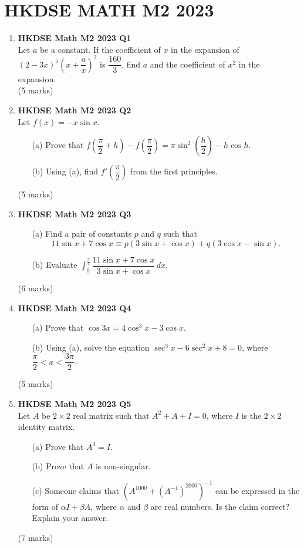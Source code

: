 \documentclass{report}
\begin{document}
\chapter{HKDSE MATH M2 2023}
\begin{enumerate}
	\item \textbf{HKDSE Math M2 2023 Q1}\\
	Let $a$ be a constant. If the coefficient of $x$ in the expansion of $(2-3x)^5\left(x + \dfrac{a}{x}\right)^2$ is $\dfrac{160}{3}$, find $a$ and the coefficient of $x^2$ in the expansion.\\
	(5 marks)

	\item \textbf{HKDSE Math M2 2023 Q2}\\
	Let $f(x) = -x \sin{x}$.
	\begin{enumerate}
		\item [(a)]Prove that $f\left(\dfrac{\pi}{2} + h\right) - f\left(\dfrac{\pi}{2}\right) = \pi \sin^2{\left(\dfrac{h}{2}\right)} - h \cos{h}$.
		\item [(b)]Using (a), find $f'\left(\dfrac{\pi}{2}\right)$ from the first principles.
	\end{enumerate}
	(5 marks)

	\item \textbf{HKDSE Math M2 2023 Q3}
	\begin{enumerate}
		\item [(a)]Find a pair of constants $p$ and $q$ such that $$11\sin{x} + 7\cos{x} \equiv p(3\sin{x} + \cos{x}) + q(3\cos{x} - \sin{x}).$$
		\item [(b)]Evaluate $\displaystyle \int^{\frac{\pi}{4}}_{0} \dfrac{11\sin{x} + 7\cos{x}}{3\sin{x} + \cos{x}} \,dx$.
	\end{enumerate}
	(6 marks)


	\item \textbf{HKDSE Math M2 2023 Q4}
	\begin{enumerate}
		\item[(a)]Prove that $\cos{3x} = 4\cos^3{x} - 3\cos{x}$.
		\item[(b)]Using (a), solve the equation $\sec^3{x} - 6\sec^2{x} + 8 = 0$, where $\dfrac{\pi}{2} < x < \dfrac{3\pi}{2}$.
	\end{enumerate}
	(5 marks)

	\item \textbf{HKDSE Math M2 2023 Q5}\\
	Let $A$ be $2\times2$ real matrix such that $A^2 + A + I = 0$, where $I$ is the $2\times2$ identity matrix. 
	\begin{enumerate}
		\item [(a)]Prove that $A^3 = I$.
		\item [(b)]Prove that $A$ is non-singular.
		\item [(c)]Someone claims that $\left(A^{1000} + (A^{-1})^{2000}\right)^{-1}$ can be expressed in the form of $\alpha I + \beta A$, where $\alpha$ and $\beta$ are real numbers. Is the claim correct? Explain your answer.
	\end{enumerate}
	(7 marks)


\end{enumerate}
\end{document}
